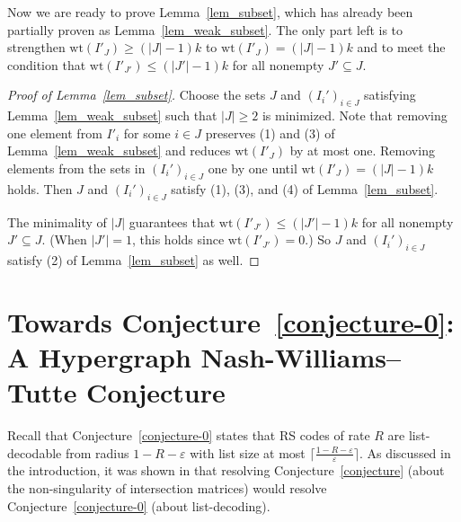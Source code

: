 \documentclass[11pt]{article}
\renewcommand{\epsilon}{\varepsilon}
\newcommand{\eps}{\epsilon}
\begin{document}
Now we are ready to prove Lemma~\ref{lem_subset},
which has already been partially proven as Lemma~\ref{lem_weak_subset}.
The only part left is to strengthen  $\mathrm{wt}(I'_J)\geq (|J|-1)k$ to $\mathrm{wt}(I'_J)=(|J|-1)k$ and to meet the condition that $\mathrm{wt}(I'_{J'})\leq (|J'|-1)k$ for all nonempty $J'\subseteq J$.

\begin{proof}[Proof of Lemma~\ref{lem_subset}]
Choose the sets $J$ and $(I_i')_{i\in J}$ satisfying Lemma~\ref{lem_weak_subset} such that $|J|\geq 2$ is minimized.
Note that removing one element from $I'_i$ for some $i\in J$ preserves (1) and (3) of Lemma~\ref{lem_weak_subset} and reduces $\mathrm{wt}(I'_J)$ by at most one.
Removing elements from the sets in $(I_i')_{i\in J}$ one by one until $\mathrm{wt}(I'_J)=(|J|-1)k$ holds. Then $J$ and $(I_i')_{i\in J}$ satisfy (1), (3), and (4) of Lemma~\ref{lem_subset}.

The minimality of $|J|$ guarantees that $\mathrm{wt}(I'_{J'})\leq (|J'|-1)k$ for all nonempty $J'\subseteq J$. (When $|J'|=1$, this holds since $\mathrm{wt}(I'_{J'})=0$.) So  $J$ and $(I_i')_{i\in J}$  satisfy (2) of Lemma~\ref{lem_subset} as well.
\end{proof}











\section{Towards Conjecture~\ref{conjecture-0}: A Hypergraph Nash-Williams--Tutte Conjecture}
\label{sec:conjectures}
%

Recall that Conjecture~\ref{conjecture-0} states that RS codes of rate $R$ are list-decodable from radius $1 - R - \eps$ with list size at most $\lceil\frac{1 - R - \eps}{\eps}\rceil$.
As discussed in the introduction, it was shown in \cite[Theorem 5.8]{shangguan2019combinatorial0} that resolving Conjecture~\ref{conjecture} (about the non-singularity of intersection matrices) would resolve Conjecture~\ref{conjecture-0} (about list-decoding).
\end{document}
